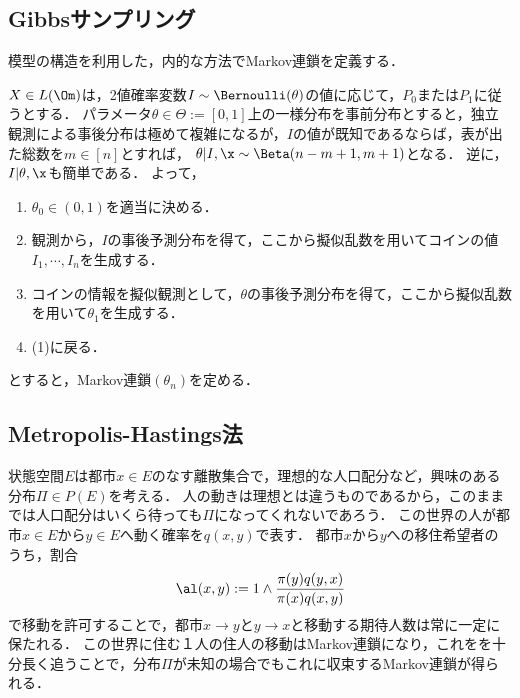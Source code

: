 \documentclass[uplatex,dvipdfmx]{jsreport}
\begin{document}
\subsection{Gibbsサンプリング}

\begin{tcolorbox}[colframe=ForestGreen, colback=ForestGreen!10!white,breakable,colbacktitle=ForestGreen!40!white,coltitle=black,fonttitle=\bfseries\sffamily,
title=]
    模型の構造を利用した，内的な方法でMarkov連鎖を定義する．
\end{tcolorbox}

\begin{example}[有限混合模型のGibbsサンプリング]
    $X\in L(\Om)$は，2値確率変数$I\sim\Bernoulli(\theta)$の値に応じて，$P_0$または$P_1$に従うとする．
    パラメータ$\theta\in\Theta:=[0,1]$上の一様分布を事前分布とすると，独立観測による事後分布は極めて複雑になるが，$I$の値が既知であるならば，表が出た総数を$m\in[n]$とすれば，
    $\theta|I,\x\sim\Beta(n-m+1,m+1)$となる．
    逆に，$I|\theta,\x$も簡単である．
    よって，
    \begin{enumerate}
        \item $\theta_0\in(0,1)$を適当に決める．
        \item 観測から，$I$の事後予測分布を得て，ここから擬似乱数を用いてコインの値$I_1,\cdots,I_n$を生成する．
        \item コインの情報を擬似観測として，$\theta$の事後予測分布を得て，ここから擬似乱数を用いて$\theta_1$を生成する．
        \item (1)に戻る．
    \end{enumerate}
    とすると，Markov連鎖$(\theta_n)$を定める．
\end{example}

\subsection{Metropolis-Hastings法}

\begin{remarks}
    状態空間$E$は都市$x\in E$のなす離散集合で，理想的な人口配分など，興味のある分布$\Pi\in P(E)$を考える．
    人の動きは理想とは違うものであるから，このままでは人口配分はいくら待っても$\Pi$になってくれないであろう．
    この世界の人が都市$x\in E$から$y\in E$へ動く確率を$q(x,y)$で表す．
    都市$x$から$y$への移住希望者のうち，割合
    \[\al(x,y):=1\land\frac{\pi(y)q(y,x)}{\pi(x)q(x,y)}\]
    で移動を許可することで，都市$x\to y$と$y\to x$と移動する期待人数は常に一定に保たれる．
    この世界に住む１人の住人の移動はMarkov連鎖になり，これをを十分長く追うことで，分布$\Pi$が未知の場合でもこれに収束するMarkov連鎖が得られる．
\end{remarks}
\end{document}
